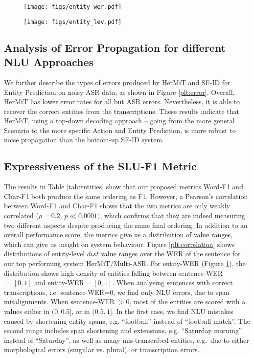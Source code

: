 \documentclass[11pt,a4paper]{article}
\newcommand{\metricname}{SLU-F1}
\newcommand{\werm}{Word-F1}
\newcommand{\levm}{Char-F1}
\newcommand{\nlu}{NLU}
\newcommand{\wer}{WER}
\newcommand{\hermit}{HerMiT}
\newcommand{\sfid}{SF-ID}
\newcommand{\masr}{Multi-ASR}
\begin{document}
\begin{figure*}[t]
\centering
  \begin{subfigure}[b]{0.45\textwidth}
    \texttt{[image: figs/entity\_wer.pdf]}
    \caption{\label{plt:werf1}}
  \end{subfigure}
\begin{subfigure}[b]{0.45\textwidth}
    \texttt{[image: figs/entity\_lev.pdf]}
    \caption{\label{plt:levf1}}
  \end{subfigure}
      \caption{Correlation between sentence-level WER (intervals of 0.5) and entity-level (a) WER values (intervals of 0.5), (b) normalised character-based Levenshtein values (intervals of 0.1).\label{plt:correlation}} \end{figure*}

\subsection{Analysis of Error Propagation for different NLU Approaches} 
We further describe the types of errors produced by \hermit{} and \sfid{} for Entity Prediction on noisy ASR data, as shown in Figure \ref{plt:error}.
Overall, \hermit{} has lower error rates for all but ASR errors. Nevertheless, it is able to recover the correct entities from the transcriptions. 
These results indicate that \hermit{}, using a top-down decoding approach -- going from the more general Scenario to the more specific Action and Entity Prediction, is more robust to noise propagation than the bottom-up \sfid{} system.



\subsection{Expressiveness of the \metricname{} Metric}
The results in Table \ref{tab:entities} show that our proposed metrics \werm{} and \levm{} both produce the same ordering as F1. 
However, a Pearson's correlation between \werm{} and \levm{} shows that the two metrics are  only weakly correlated ($\rho= 0.2$, $p\ll0.0001)$, which confirms that they are indeed measuring two different aspects despite producing the same final ordering.
In addition to an overall performance score, the metrics give us a distribution of value ranges, which
can give us insight on system behaviour. Figure \ref{plt:correlation} shows distributions of
entity-level $dist$ value ranges over the \wer{} of the sentence for our top performing system \hermit/\masr.
For entity-WER (Figure \ref{plt:werf1}), the distribution shows high density of entities falling between sentence-WER$=[0,1]$ and entity-WER$=[0,1]$. When analysing sentences with correct transcriptions, i.e. sentence-WER=$0$, we find only \nlu{} errors, due to span misalignments. When sentence-WER $>0$, most of the entities are scored with a values either in $(0,0.5]$, or in $(0.5,1]$. In the first case, we find \nlu{} mistakes caused by shortening entity spans, e.g. ``football'' instead of ``football match''. The second range includes span  shortening and extensions, e.g. ``Saturday morning'' instead of ``Saturday'', as well as many mis-transcribed entities, e.g.\ due to either morphological errors (singular vs. plural), or transcription errors. 
\end{document}
